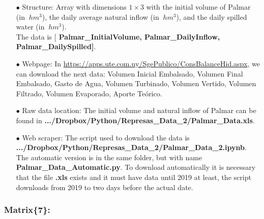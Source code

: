 \documentclass[12pt]{article}
\theoremstyle{definition}
\theoremstyle{remark}
\begin{document}
\begin{enumerate}

\item[$\bullet$] Structure: Array with dimensions $1\times3$ with the initial volume of Palmar (in $\SI{}{hm^3}$), the daily average natural inflow (in $\SI{}{hm^3}$), and the daily spilled water (in $\SI{}{hm^3}$).\\
The data is [\textbf{{\color{blue} Palmar\_InitialVolume, Palmar\_DailyInflow, Palmar\_DailySpilled}]}.

\item[$\bullet$] Webpage: In {\color{blue} \url{https://apps.ute.com.uy/SgePublico/ConsBalanceHid.aspx}}, we can download the next data: {\color{orange} Volumen Inicial Embalsado, Volumen Final Embalsado, Gasto de Agua,  Volumen Turbinado, Volumen Vertido, Volumen Filtrado, Volumen Evaporado, Aporte Te\'orico}.

\item[$\bullet$] Raw data location: The initial volume and natural inflow of Palmar can be found in \textbf{.../Dropbox/Python/Represas\_Data\_2/Palmar\_Data.xls}.

\item[$\bullet$] Web scraper: The script used to download the data is \textbf{.../Dropbox/Python/Represas\_Data\_2/Palmar\_Data\_2.ipynb}. The automatic version is in the same folder, but with name \textbf{Palmar\_Data\_Automatic.py}. To download automatically it is necessary that the file \textbf{.xls} exists and it must have data until 2019 at least, the script downloads from 2019 to two days before the actual date.

\end{enumerate}

\subsubsection{Matrix\{7\}:}
\end{document}
